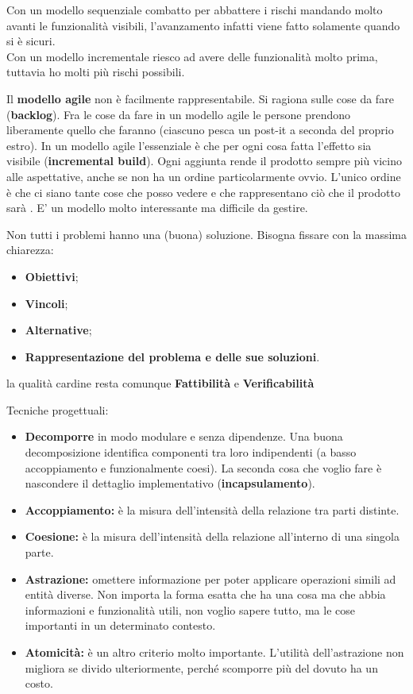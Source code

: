 Con un modello sequenziale combatto per abbattere i rischi mandando molto avanti le funzionalità visibili, l'avanzamento infatti viene fatto solamente quando si è sicuri.\\
Con un modello incrementale riesco ad avere delle funzionalità molto prima, tuttavia ho molti più rischi possibili.

Il \textbf{modello agile} non è facilmente rappresentabile. Si ragiona sulle cose da fare (\textbf{backlog}). Fra le cose da fare in un modello agile le persone prendono liberamente quello che faranno (ciascuno pesca un post-it a seconda del proprio estro). In un modello agile l'essenziale è che per ogni cosa fatta l'effetto sia visibile (\textbf{incremental build}). Ogni aggiunta rende il prodotto sempre più vicino alle aspettative, anche se non ha un ordine particolarmente ovvio. L'unico ordine è che ci siano tante cose che posso vedere e che rappresentano ciò che il prodotto sarà . E' un modello molto interessante ma difficile da gestire.

Non tutti i problemi hanno una (buona) soluzione. Bisogna fissare con la massima chiarezza:

\begin{itemize}

	\item \textbf{Obiettivi};
	\item \textbf{Vincoli};
	\item \textbf{Alternative};
	\item \textbf{Rappresentazione del problema e delle sue soluzioni}.

\end{itemize}
la qualità cardine resta comunque \textbf{Fattibilità} e \textbf{Verificabilità}

Tecniche progettuali:
\begin{itemize}
	\item \textbf{Decomporre} in modo modulare e senza dipendenze. Una buona decomposizione identifica componenti tra loro indipendenti (a basso accoppiamento e funzionalmente coesi). La seconda cosa che voglio fare è nascondere il dettaglio implementativo (\textbf{incapsulamento}).
	\item\textbf{Accoppiamento:} è la misura dell'intensità della relazione tra parti distinte.
	\item\textbf{Coesione:} è la misura dell'intensità della relazione all'interno di una singola parte.
	\item\textbf{Astrazione:} omettere informazione per poter applicare operazioni simili ad entità diverse. Non importa la forma esatta che ha una cosa ma che abbia informazioni e funzionalità  utili, non voglio sapere tutto, ma le cose importanti in un determinato contesto.
	\item\textbf{Atomicità:} è un altro criterio molto importante. L'utilità  dell'astrazione non migliora se divido ulteriormente, perché scomporre più del dovuto ha un costo.
\end{itemize}

